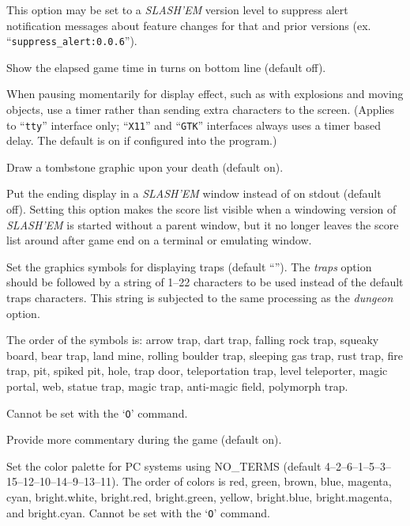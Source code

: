 \item[\ib{suppress\_alert}]
This option may be set to a {\it SLASH'EM\/} version level to suppress
alert notification messages about feature changes for that 
and prior versions (ex. ``{\tt suppress\_alert:0.0.6}'').

\item[\ib{time}]
Show the elapsed game time in turns on bottom line (default off).

\item[\ib{timed\_delay}]
When pausing momentarily for display effect, such as with explosions and
moving objects, use a timer rather than sending extra characters to the
screen.  (Applies to ``{\tt tty}'' interface only; ``{\tt X11}'' and ``{\tt GTK}'' interfaces always
uses a timer based delay.  The default is on if configured into the
program.)

\item[\ib{tombstone}]
Draw a tombstone graphic upon your death (default on).

\item[\ib{toptenwin}]
Put the ending display in a {\it SLASH'EM\/} window instead of on stdout (default off).
Setting this option makes the score list visible when a windowing version
of {\it SLASH'EM\/} is started without a parent window, but it no longer leaves
the score list around after game end on a terminal or emulating window.

\item[\ib{traps}]
Set the graphics symbols for displaying traps
(default \relax{}``'').
The
{\it traps\/} 
option should be followed by a string of 1--22
characters to be used instead of the default traps characters.
This string is subjected to the same processing as the
{\it dungeon\/} 
option.

The order of the symbols is: 
arrow trap, dart trap, falling rock trap, squeaky board, bear trap,
land mine, rolling boulder trap, sleeping gas trap, rust trap, fire trap,
pit, spiked pit, hole, trap door, teleportation trap, level teleporter,
magic portal, web, statue trap, magic trap, anti-magic field, polymorph trap.

Cannot be set with the `{\tt O}' command.

\item[\ib{verbose}]
Provide more commentary during the game (default on).

\item[\ib{videocolors}]
Set the color palette for PC systems using NO\_TERMS
(default 4--2--6--1--5--3--15--12--10--14--9--13--11).
The order of colors is red, green, brown, blue, magenta, cyan,
bright.white, bright.red, bright.green, yellow, bright.blue,
bright.magenta, and bright.cyan.
Cannot be set with the `{\tt O}' command.

